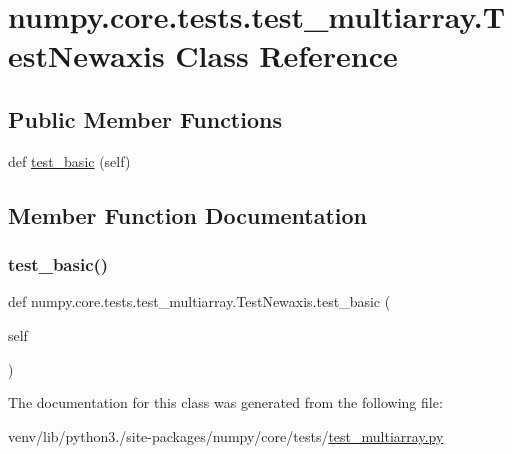\hypertarget{classnumpy_1_1core_1_1tests_1_1test__multiarray_1_1TestNewaxis}{}\section{numpy.\+core.\+tests.\+test\+\_\+multiarray.\+Test\+Newaxis Class Reference}
\label{classnumpy_1_1core_1_1tests_1_1test__multiarray_1_1TestNewaxis}
\subsection*{Public Member Functions}
\begin{DoxyCompactItemize}
\item 
def \hyperlink{classnumpy_1_1core_1_1tests_1_1test__multiarray_1_1TestNewaxis_a55ad46bb7d3daca7a27e40d93393f6e9}{test\+\_\+basic} (self)
\end{DoxyCompactItemize}


\subsection{Member Function Documentation}
\mbox{\label{classnumpy_1_1core_1_1tests_1_1test__multiarray_1_1TestNewaxis_a55ad46bb7d3daca7a27e40d93393f6e9}} 
\subsubsection{\texorpdfstring{test\+\_\+basic()}{test\_basic()}}
{\footnotesize\ttfamily def numpy.\+core.\+tests.\+test\+\_\+multiarray.\+Test\+Newaxis.\+test\+\_\+basic (\begin{DoxyParamCaption}\item[{}]{self }\end{DoxyParamCaption})}



The documentation for this class was generated from the following file\+:\begin{DoxyCompactItemize}
\item 
venv/lib/python3./site-\/packages/numpy/core/tests/\hyperlink{core_2tests_2test__multiarray_8py}{test\+\_\+multiarray.\+py}\end{DoxyCompactItemize}
